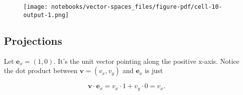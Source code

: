 \documentclass[
  letterpaper,
  DIV=11,
  numbers=noendperiod]{scrreprt}
\newenvironment{Shaded}{\begin{snugshade}}{\end{snugshade}}
\newcommand{\DecValTok}[1]{\textcolor[rgb]{0.68,0.00,0.00}{#1}}
\newcommand{\FloatTok}[1]{\textcolor[rgb]{0.68,0.00,0.00}{#1}}
\newcommand{\NormalTok}[1]{\textcolor[rgb]{0.00,0.23,0.31}{#1}}
\newcommand{\OperatorTok}[1]{\textcolor[rgb]{0.37,0.37,0.37}{#1}}
\newcommand{\SpecialCharTok}[1]{\textcolor[rgb]{0.37,0.37,0.37}{#1}}
\newcommand{\StringTok}[1]{\textcolor[rgb]{0.13,0.47,0.30}{#1}}
\begin{document}
\begin{Shaded}
\end{Shaded}

\begin{figure}[H]

{\centering \texttt{[image: notebooks/vector-spaces\_files/figure-pdf/cell-10-output-1.png]}

}

\end{figure}

\hypertarget{projections}{%
\subsection{Projections}\label{projections}}

Let \(\mathbf{e}_x=(1,0)\). It's the unit vector pointing along the
positive x-axis. Notice the dot product between
\(\mathbf{v}=(v_x, v_y)\) and \(\mathbf{e}_x\) is just

\[\mathbf{v} \cdot \mathbf{e}_x = v_x \cdot 1 + v_y \cdot 0 = v_x.\]
\end{document}
